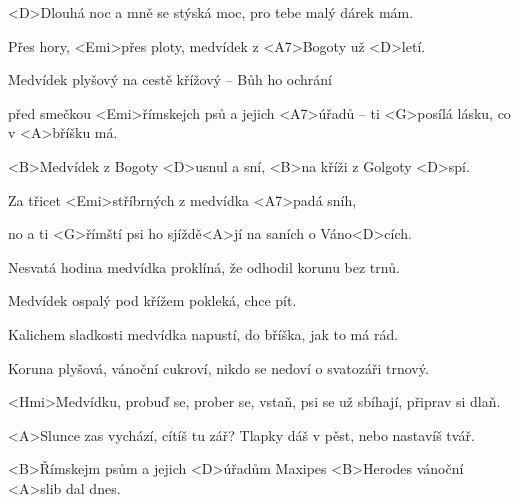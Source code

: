 

\zs
<D>Dlouhá noc a mně se stýská moc,
pro tebe malý dárek mám.

Přes hory, <Emi>přes ploty,
medvídek z <A7>Bogoty už <D>letí.

Medvídek plyšový na cestě
křížový -- Bůh ho ochrání

před smečkou <Emi>římskejch psů
a jejich <A7>úřadů --
ti <G>posílá lásku, co v <A>bříšku má.
\ks


\zr
<B>Medvídek z Bogoty <D>usnul a sní,
<B>na kříži z Golgoty <D>spí.

Za třicet <Emi>stříbrných
z medvídka <A7>padá sníh,

no a ti <G>římští psi
ho sjíždě<A>jí na saních o Váno<D>cích.
\kr

\zs
Nesvatá hodina medvídka proklíná,
že odhodil korunu bez trnů.

Medvídek ospalý pod křížem pokleká,
chce pít.

Kalichem sladkosti medvídka
napustí, do bříška, jak to má rád.

Koruna plyšová, vánoční cukroví,
nikdo se nedoví o svatozáři trnový.
\ks

\zr \kr

\zs
<Hmi>Medvídku, probuď se, prober se, vstaň,
psi se už sbíhají, připrav si dlaň.

<A>Slunce zas vychází, cítíš tu zář?
Tlapky dáš v pěst, nebo nastavíš tvář.

<B>Římskejm psům a jejich <D>úřadům
Maxipes <B>Herodes vánoční <A>slib dal dnes.
\ks

\zr \kr

\kp
